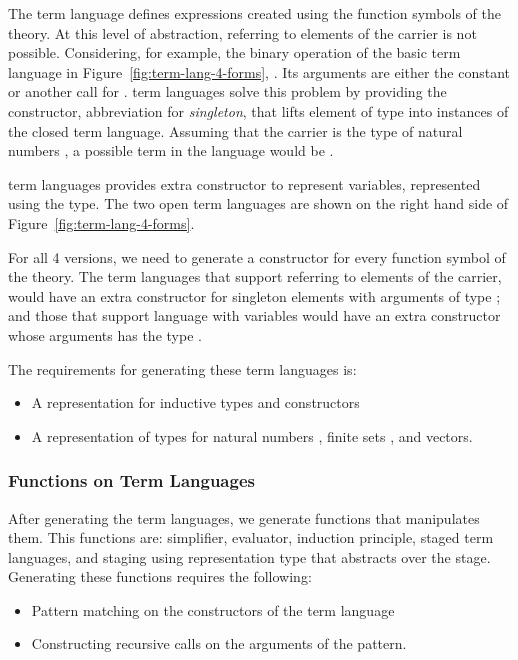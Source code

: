 The  term language defines expressions created using the function symbols of the theory. At this level of abstraction, referring to elements of the carrier is not possible.
Considering, for example, the binary operation of the basic  term language in Figure~\ref{fig:term-lang-4-forms}, . Its arguments are either the constant  or another call for . 
 term languages solve this problem by providing the  constructor, abbreviation for \emph{singleton}, that lifts element of type  into instances of the closed term language. Assuming that the carrier is the type of natural numbers , a possible term in the language would be . 

 term languages provides extra constructor to represent variables, represented using the  type. The two open term languages are shown on the right hand side of Figure~\ref{fig:term-lang-4-forms}.  

For all 4 versions, we need to generate a constructor for every function symbol of the theory. The term languages that support referring to elements of the carrier, would have an extra constructor for singleton elements with arguments of type ; and those that support language with variables would have an extra constructor whose arguments has the type . 

The requirements for generating these term languages is: 
\begin{itemize}
\item A representation for inductive types and constructors 
\item A representation of types for natural numbers , finite sets , and vectors. 
\end{itemize}

\subsubsection{Functions on Term Languages}
\label{sec:gen:reqs:funcs}
After generating the term languages, we generate functions that manipulates them. This functions are: simplifier, evaluator, induction principle, staged term languages, and staging using representation type that abstracts over the stage. Generating these functions requires the following: 
\begin{itemize}
\item Pattern matching on the constructors of the term language 
\item Constructing recursive calls on the arguments of the pattern. 
\end{itemize} 

